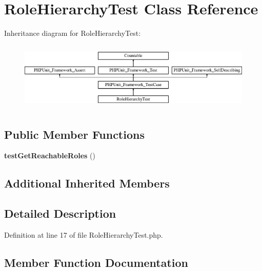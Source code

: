 \section{Role\+Hierarchy\+Test Class Reference}
\label{class_symfony_1_1_component_1_1_security_1_1_core_1_1_tests_1_1_role_1_1_role_hierarchy_test}
Inheritance diagram for Role\+Hierarchy\+Test\+:\begin{figure}[H]
\begin{center}
\leavevmode
\includegraphics[height=3.303835cm]{class_symfony_1_1_component_1_1_security_1_1_core_1_1_tests_1_1_role_1_1_role_hierarchy_test}
\end{center}
\end{figure}
\subsection*{Public Member Functions}
\begin{DoxyCompactItemize}
\item 
{\bf test\+Get\+Reachable\+Roles} ()
\end{DoxyCompactItemize}
\subsection*{Additional Inherited Members}


\subsection{Detailed Description}


Definition at line 17 of file Role\+Hierarchy\+Test.\+php.



\subsection{Member Function Documentation}
